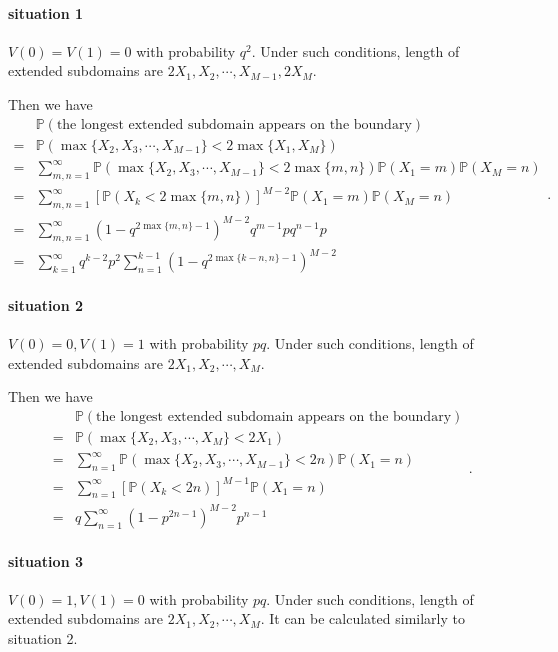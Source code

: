 \documentclass[a4paper,11pt]{article}
\begin{document}
\begin{appendices}
\paragraph*{situation 1}
$V(0) = V(1) = 0$ with probability $q^2$. Under such conditions, length of extended subdomains are $2 X_1, X_2, \cdots, X_{M-1}, 2 X_M$.

Then we have
\begin{equation*}
\begin{split}
  & \mathbb{P}(\text{the longest extended subdomain appears on the boundary}) \\
= & \mathbb{P}(\max\{X_2, X_3, \cdots, X_{M-1}\} < 2 \max\{X_1, X_M\}) \\
= & \sum_{m,n=1}^{\infty} \mathbb{P}(\max\{X_2, X_3, \cdots, X_{M-1}\} < 2 \max\{m,  n\}) \mathbb{P}(X_1 = m) \mathbb{P}(X_M = n) \\
= & \sum_{m,n=1}^{\infty} [\mathbb{P}(X_k < 2 \max\{m,n\}) ]^{M-2} \mathbb{P}(X_1 = m) \mathbb{P}(X_M = n)\\
= & \sum_{m,n=1}^{\infty} (1 - q^{2 \max\{m,n\}-1})^{M-2} q^{m-1} p q^{n-1} p\\
= & \sum_{k=1}^{\infty} q^{k-2} p^2 \sum_{n=1}^{k-1} (1 - q^{2 \max\{k-n,n\}-1})^{M-2} 
\end{split}.
\end{equation*}

\paragraph*{situation 2}
$V(0) = 0, V(1) = 1$ with probability $p q$. Under such conditions, length of extended subdomains are $2 X_1, X_2, \cdots, X_M$.

Then we have
\begin{equation*}
\begin{split}
  & \mathbb{P}(\text{the longest extended subdomain appears on the boundary}) \\
= & \mathbb{P}(\max\{X_2, X_3, \cdots, X_{M}\} < 2 X_1) \\
= & \sum_{n=1}^{\infty} \mathbb{P}(\max\{X_2, X_3, \cdots, X_{M-1}\} < 2 n) \mathbb{P}(X_1 = n) \\
= & \sum_{n=1}^{\infty} [\mathbb{P}(X_k < 2 n)]^{M-1} \mathbb{P}(X_1 = n)\\
= & q \sum_{n=1}^{\infty} (1 - p^{2 n-1})^{M-2} p^{n-1}
\end{split}.
\end{equation*}

\paragraph*{situation 3}
$V(0) = 1, V(1) = 0$ with probability $p q$. Under such conditions, length of extended subdomains are $2 X_1, X_2, \cdots, X_M$. It can be calculated similarly to situation 2.


\end{appendices}
\end{document}
